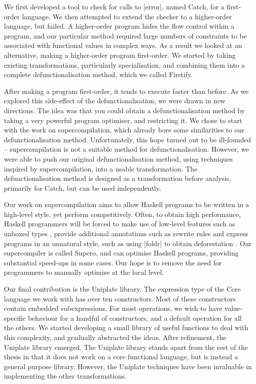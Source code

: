 We first developed a tool to check for calls to |error|, named Catch, for a first-order language. We then attempted to extend the checker to a higher-order language, but failed. A higher-order program hides the flow control within a program, and our particular method required large numbers of constraints to be associated with functional values in complex ways. As a result we looked at an alternative, making a higher-order program first-order. We started by taking existing transformations, particularly specialisation, and combining them into a complete defunctionalisation method, which we called Firstify.

After making a program first-order, it tends to execute faster than before. As we explored this side-effect of the defunctionalisation, we were drawn in new directions. The idea was that you could obtain a defunctionalisation method by taking a very powerful program optimiser, and restricting it. We chose to start with the work on supercompilation, which already bore some similarities to our defunctionalisation  method. Unfortunately, this hope turned out to be ill-founded -- supercompilation is not a suitable method for defunctionalisation. However, we were able to push our original defunctionalisation method, using techniques inspired by supercompilation, into a usable transformation. The defunctionalisation method is designed as a transformation before analysis, primarily for Catch, but can be used independently.

Our work on supercompilation aims to allow Haskell programs to be written in a high-level style, yet perform competitively. Often, to obtain high performance, Haskell programmers will be forced to make use of low-level features such as unboxed types \cite{spj:unboxed_types}, provide additional annotations such as rewrite rules \cite{spj:rewrite_rules} and express programs in an unnatural style, such as using |foldr| to obtain deforestation \cite{gill:shortcut_deforestation}. Our supercompiler is called Supero, and can optimise Haskell programs, providing substantial speed-ups in some cases. Our hope is to remove the need for programmers to manually optimise at the local level.

Our final contribution is the Uniplate library. The expression type of the Core language we work with has over ten constructors. Most of these constructors contain embedded subexpressions. For most operations, we wish to have value-specific behaviour for a handful of constructors, and a default operation for all the others. We started developing a small library of useful functions to deal with this complexity, and gradually abstracted the ideas. After refinement, the Uniplate library emerged. The Uniplate library stands apart from the rest of the thesis in that it does not work on a core functional language, but is instead a general purpose library. However, the Uniplate techniques have been invaluable in implementing the other transformations.


